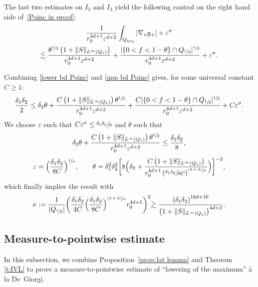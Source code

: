 \documentclass[JEP,XML,SOM,Unicode,NoFloatCountersInSection,published]{cedram}
\newcommand{\psfrac}[2]{\sfrac{(#1)}{#2}}
\theoremstyle{definition}
\theoremstyle{remark}
\let\var\varepsilon
\begin{document}
The last two estimates on $I_2$ and $I_3$ yield the following
control on the right hand side of~\eqref{Poinc in proof}:
\begin{multline}
\label{upp bd Poinc}
\frac{1}{r_0^{4d+1} \varepsilon^{d+2}}
\int_{Q_{5r_0}} |\nabla_v g_+| +
\varepsilon^\sigma\\
\lesssim
\frac{\theta^{\sfrac12}\left(1+\|S\|_{L^\infty(Q_1)}\right)}{r_0^{4d+1}
\varepsilon^{d+2}}
+ \frac{|\{0<f<1-\theta\}\cap
Q_{\sfrac12}|^{\sfrac12}}{r_0^{4d+1}\varepsilon^{d+2}}
+ \varepsilon^\sigma.
\end{multline}

Combining \eqref{lower bd Poinc} and \eqref{upp bd Poinc} gives,
for some universal constant $C\geq 1$:
\begin{equation}
\label{estim finale}
\frac{\delta_1 \delta_2}{2} \le \delta_2 \theta +
\frac{C\left(1+\|S\|_{L^\infty(Q_1)} \right)
\theta^{\sfrac12}}{r_0^{4d+1} \varepsilon^{d+2}}
+ \frac{C|\{0<f<1-\theta\}\cap
Q_{\sfrac12}|^{\sfrac12}}{r_0^{4d+1} \var^{d+2}} + C \varepsilon^\sigma.
\end{equation}
We choose $\varepsilon$ such that
$C\varepsilon^\sigma \leq \sfrac{\delta_1 \delta_2}{8}$ and
$\theta$ such that
\[
\delta_2 \theta + \frac{C\left(1+\|S\|_{L^\infty(Q_1)}\right)
\theta^{\sfrac12}}{r_0^{4d+1}\var^{d+2}} \leq \frac{\delta_1
\delta_2}{8},
\]
\eg
\begin{equation}
\label{eq:choice-theta}
\varepsilon=\Bigl(\frac{\delta_1\delta_2}{8C}\Bigr)^{\sfrac{1}{\sigma}},
\qquad
\theta= \delta_1^2 \delta_2^2 \biggl[ 8\Bigl( \delta_2 +
\frac{C\left(1+\|S\|_{L^\infty(Q_1)}\right)}{r_0^{4d+1} \left(
\sfrac{\delta_1\delta_2}{8C}
\right)^{\psfrac{d+2}{\sigma}}}\Bigr) \biggr]^{-2},
\end{equation}
which finally implies the result with
\begin{equation}
\label{eq:choice-nu}
\nu:= \frac{1}{|Q_{\sfrac12}|}\biggl(\frac{\delta_1\delta_2}{4C}
\Bigl(\frac{\delta_1\delta_2}{8C}\Bigr)^{\psfrac{d+2}{\sigma}}
r_0^{4d+1}\biggl)^2 \gtrsim
\frac{\left( \delta_1 \delta_2
\right)^{10d+16}}{\left(1+\|S\|_{L^\infty(Q_1)}\right)^{4d+2}}.
\end{equation}

\subsection{Measure-to-pointwise estimate}
\label{ss:m2p}

In this subsection, we combine Proposition~\ref{prop:1st lemma}
and Theorem \ref{t:IVL} to prove a measure-to-pointwise estimate
of ``lowering of the maximum'' à la De~Giorgi.
\end{document}
